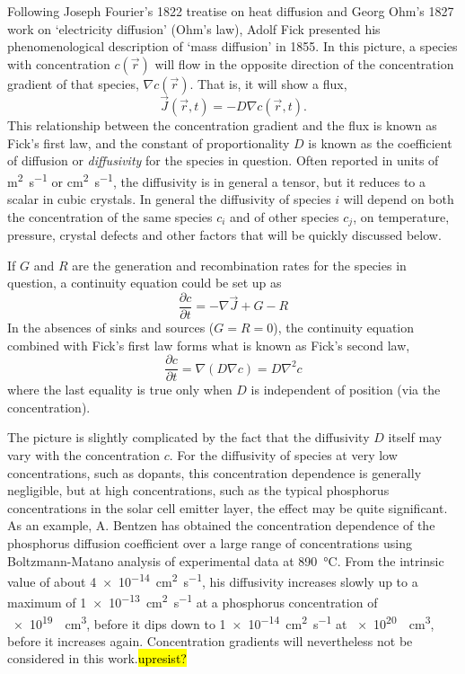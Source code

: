 \documentclass[11pt,bibliography=totoc,index=totoc]{scrbook}   %
\newcommand{\comment}[1]{\hl{#1}}
\begin{document}
Following Joseph Fourier's 1822 treatise on heat diffusion\cite{Fourier:1822} and Georg Ohm's 1827 work on `electricity diffusion' (Ohm's law),\cite{Ohm:1827} Adolf Fick presented his phenomenological description of `mass diffusion' in 
1855.\cite{Fick:1855}
In this picture, a species with concentration $c(\vec{r})$ will flow in the opposite direction of the concentration gradient of that species, $\nabla c(\vec{r})$. That is, it will show a flux,
\begin{equation}
  \vec{J}(\vec{r},t) = - D \nabla c(\vec{r},t).
  \label{eq:ficks1st}
\end{equation}
This relationship between the concentration gradient and the flux is known as Fick's first law, and the constant of proportionality $D$ is known as the coefficient of diffusion or \emph{diffusivity} for the species in question. 
Often reported in units of \si{\metre\squared\per\second} or \si{\centi\metre\squared\per\second}, the diffusivity is in general a tensor, but it reduces to a scalar in cubic crystals. 
In general the diffusivity of species $i$ will depend on both the concentration of the same species $c_i$ and of other species $c_j$, on temperature, pressure, crystal defects and other factors that will be quickly discussed below.

If $G$ and $R$ are the generation and recombination rates for the species in question, a continuity equation could be set up as
\begin{equation}
    \frac{\partial c}{\partial t} = -\nabla \vec{J} + G - R
  \label{eq:continuity}
\end{equation}
In the absences of sinks and sources ($G=R=0$), the continuity equation combined with Fick's first law forms what is known as Fick's second law,
\begin{equation}
    \frac{\partial c}{\partial t} = \nabla (D \nabla c) = D \nabla^2 c
  \label{eq:ficks2nd}
\end{equation}
where the last equality is true only when $D$ is independent of position (via the concentration).

The picture is slightly complicated by the fact that the diffusivity $D$ itself may vary with the concentration $c$.
For the diffusivity of species at very low concentrations, such as dopants, this concentration dependence is generally negligible, but at high concentrations, such as the typical phosphorus concentrations in the solar cell emitter layer, the effect may be quite significant.
As an example, A. Bentzen has obtained the concentration dependence of the phosphorus diffusion coefficient over a large range of concentrations using Boltzmann-Matano analysis of experimental data at \SI{890}{\celsius}. 
From the intrinsic value of about \SI{4e-14}{\centi\metre\squared\per\second}, his diffusivity increases slowly up to a maximum of \SI{1e-13}{\centi\metre\squared\per\second} at a phosphorus concentration of \SI{e19}{\per\centi\metre\cubed}, before it dips down to \SI{1e-14}{\centi\metre\squared\per\second} at \SI{e20}{\per\centi\metre\cubed}, before it increases again.\cite{Bentzen:2006} Concentration gradients will nevertheless not be considered in this work.\comment{upresist?}
\end{document}
